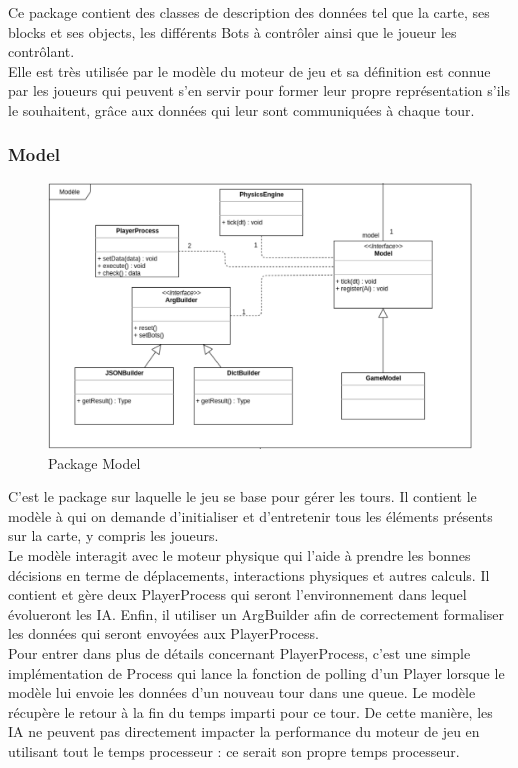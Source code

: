 Ce package contient des classes de description des données tel que la carte, ses blocks et ses objects, les différents Bots à contrôler ainsi que le joueur les contrôlant.\\

Elle est très utilisée par le modèle du moteur de jeu et sa définition est connue par les joueurs qui peuvent s'en servir pour former leur propre représentation s'ils le souhaitent, grâce aux données qui leur sont communiquées à chaque tour.

\subsubsection{Model}

\begin{figure}[H]
    \centering
    \includegraphics[scale=0.35]{data/archi/model.png}
    \caption{Package Model}
\end{figure}

C'est le package sur laquelle le jeu se base pour gérer les tours. Il contient le modèle à qui on demande d'initialiser et d'entretenir tous les éléments présents sur la carte, y compris les joueurs.\\

Le modèle interagit avec le moteur physique qui l'aide à prendre les bonnes décisions en terme de déplacements, interactions physiques et autres calculs. Il contient et gère deux PlayerProcess qui seront l'environnement dans lequel évolueront les IA. Enfin, il utiliser un ArgBuilder afin de correctement formaliser les données qui seront envoyées aux PlayerProcess.\\

Pour entrer dans plus de détails concernant PlayerProcess, c'est une simple implémentation de Process qui lance la fonction de polling d'un Player lorsque le modèle lui envoie les données d'un nouveau tour dans une queue. Le modèle récupère le retour à la fin du temps imparti pour ce tour. De cette manière, les IA ne peuvent pas directement impacter la performance du moteur de jeu en utilisant tout le temps processeur : ce serait son propre temps processeur.

